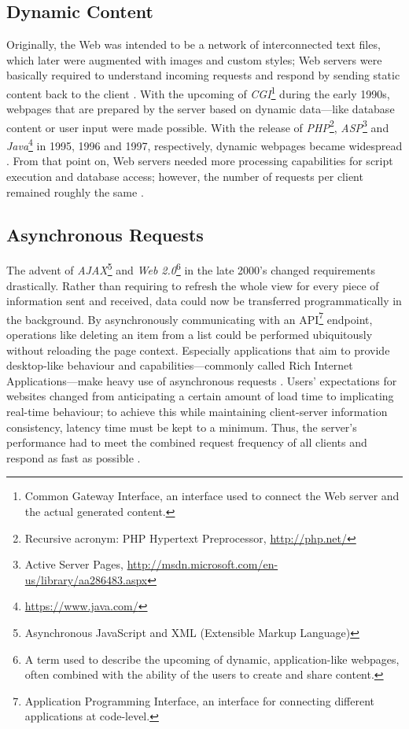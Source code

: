 \subsection{Dynamic Content}
Originally, the Web was intended to be a network of interconnected text files, which later were augmented with images and custom styles; Web servers were basically required to understand incoming requests and respond by sending static content back to the client \cite{http}. With the upcoming of \textit{CGI}\footnote{Common Gateway Interface, an interface used to connect the Web server and the actual generated content.} during the early 1990s, webpages that are prepared by the server based on dynamic data---like database content or user input were made possible. With the release of \textit{PHP}\footnote{Recursive acronym: PHP Hypertext Preprocessor, \url{http://php.net/}}, \textit{ASP}\footnote{Active Server Pages, \url{http://msdn.microsoft.com/en-us/library/aa286483.aspx}} and \textit{Java}\footnote{\url{https://www.java.com/}} in 1995, 1996 and 1997, respectively, dynamic webpages became widespread \cite{webhistory}. From that point on, Web servers needed more processing capabilities for script execution and database access; however, the number of requests per client remained roughly the same \cite{webhistory}.

\subsection{Asynchronous Requests}
The advent of \textit{AJAX}\footnote{Asynchronous JavaScript and XML (Extensible Markup Language)} and \textit{Web 2.0}\footnote{A term used to describe the upcoming of dynamic, application-like webpages, often combined with the ability of the users to create and share content.} in the late 2000's changed requirements drastically. Rather than requiring to refresh the whole view for every piece of information sent and received, data could now be transferred programmatically in the background. By asynchronously communicating with an API\footnote{Application Programming Interface, an interface for connecting different applications at code-level.} endpoint, operations like deleting an item from a list could be performed ubiquitously without reloading the page context. Especially applications that aim to provide desktop-like behaviour and capabilities---commonly called Rich Internet Applications---make heavy use of asynchronous requests \cite[p. 4]{Sencha2011}. Users' expectations for websites changed from anticipating a certain amount of load time to implicating real-time behaviour; to achieve this while maintaining client-server information consistency, latency time must be kept to a minimum. Thus, the server's performance had to meet the combined request frequency of all clients and respond as fast as possible \cite{Garrett2005}.

